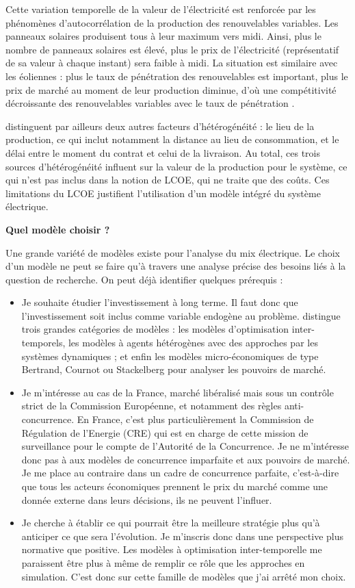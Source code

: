 Cette variation temporelle de la valeur de l'électricité est renforcée par les phénomènes d’autocorrélation de la production des renouvelables variables. Les panneaux solaires produisent tous à leur maximum vers midi. Ainsi, plus le nombre de panneaux solaires est élevé, plus le prix de l’électricité (représentatif de sa valeur à chaque instant) sera faible à midi. La situation est similaire avec les éoliennes : plus le taux de pénétration des renouvelables est important, plus le prix de marché au moment de leur production diminue, d’où une compétitivité décroissante des renouvelables variables avec le taux de pénétration \citep{Hirth2013}.

\citet{Hirth2016} distinguent par ailleurs deux autres facteurs d’hétérogénéité : le lieu de la production, ce qui inclut notamment la distance au lieu de consommation, et le délai entre le moment du contrat et celui de la livraison. Au total, ces trois sources d’hétérogénéité influent sur la valeur de la production pour le système, ce qui n’est pas inclus dans la notion de LCOE, qui ne traite que des coûts. 
Ces limitations du LCOE justifient l’utilisation d’un modèle intégré du système électrique.

\vspace{1em}
\textbf{Quel modèle choisir ?}

Une grande variété de modèles existe pour l’analyse du mix électrique. Le choix d’un modèle ne peut se faire qu’à travers une analyse précise des besoins liés à la question de recherche.
On peut déjà identifier quelques prérequis :
\begin{itemize}
	\item Je souhaite étudier l’investissement à long terme. Il faut donc que l’investissement soit inclus comme variable endogène au problème. \citet{Petitet2016} distingue trois grandes catégories de modèles : les modèles d’optimisation inter-temporels, les modèles à agents hétérogènes avec des approches par les systèmes dynamiques ; et enfin les modèles micro-économiques de type Bertrand, Cournot ou Stackelberg pour analyser les pouvoirs de marché. 
	\item Je m’intéresse au cas de la France, marché libéralisé mais sous un contrôle strict de la Commission Européenne, et notamment des règles anti-concurrence. En France, c’est plus particulièrement la Commission de Régulation de l’Energie (CRE) qui est en charge de cette mission de surveillance pour le compte de l'Autorité de la Concurrence. Je ne m’intéresse donc pas à aux modèles de concurrence imparfaite et aux pouvoirs de marché. Je me place au contraire dans un cadre de concurrence parfaite, c’est-à-dire que tous les acteurs économiques prennent le prix du marché comme une donnée externe dans leurs décisions, ils ne peuvent l’influer. 
	\item Je cherche à établir ce qui pourrait être la meilleure stratégie plus qu’à anticiper ce que sera l’évolution. Je m’inscris donc dans une perspective plus normative que positive. Les modèles à optimisation inter-temporelle me paraissent être plus à même de remplir ce rôle que les approches en simulation. C’est donc sur cette famille de modèles que j’ai arrêté mon choix.
\end{itemize}

